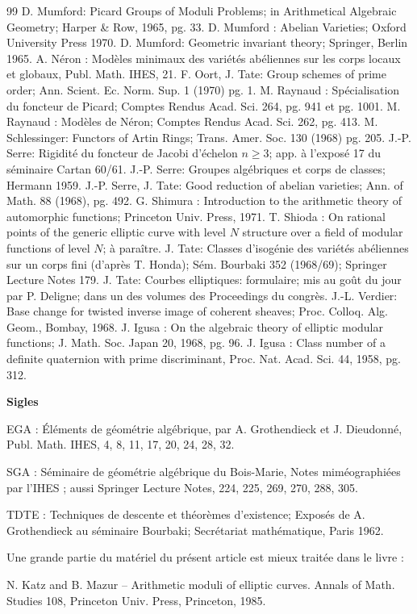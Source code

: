 \documentclass[12pt,a4paper]{amsart}
\theoremstyle{plain}
\theoremstyle{definition}
\theoremstyle{remark}
\begin{document}
\begin{thebibliography}{99}
 D. Mumford: Picard Groups of Moduli Problems; in Arithmetical Algebraic Geometry; Harper \& Row, 1965, pg. 33.
 D. Mumford : Abelian Varieties; Oxford University Press 1970.
 D. Mumford: Geometric invariant theory; Springer, Berlin 1965.
 A. N\'eron : Mod\`eles minimaux des vari\'et\'es ab\'eliennes sur les corps locaux et globaux, Publ. Math. IHES, 21.
 F. Oort, J. Tate: Group schemes of prime order; Ann. Scient. Ec. Norm. Sup. 1 (1970) pg. 1.
 M. Raynaud : Sp\'ecialisation du foncteur de Picard; Comptes Rendus Acad. Sci. 264, pg. 941 et pg. 1001.
 M. Raynaud : Mod\`eles de N\'eron; Comptes Rendus Acad. Sci. 262, pg. 413.
 M. Schlessinger: Functors of Artin Rings; Trans. Amer. Soc. 130 (1968) pg. 205.
 J.-P. Serre: Rigidit\'e du foncteur de Jacobi d'\'echelon $n \geq 3$; app. \`a l'expos\'e 17 du s\'eminaire Cartan 60/61.
 J.-P. Serre: Groupes alg\'ebriques et corps de classes; Hermann 1959.
 J.-P. Serre, J. Tate: Good reduction of abelian varieties; Ann. of Math. 88 (1968), pg. 492.
 G. Shimura : Introduction to the arithmetic theory of automorphic functions; Princeton Univ. Press, 1971.
 T. Shioda : On rational points of the generic elliptic curve with level $N$ structure over a field of modular functions of level $N$; \`a para\^itre.
 J. Tate: Classes d'isog\'enie des vari\'et\'es ab\'eliennes sur un corps fini (d'apr\`es T. Honda); S\'em. Bourbaki 352 (1968/69); Springer Lecture Notes 179.
 J. Tate: Courbes elliptiques: formulaire; mis au go\^ut du jour par P. Deligne; dans un des volumes des Proceedings du congr\`es.
 J.-L. Verdier: Base change for twisted inverse image of coherent sheaves; Proc. Colloq. Alg. Geom., Bombay, 1968.
 J. Igusa : On the algebraic theory of elliptic modular functions; J. Math. Soc. Japan 20, 1968, pg. 96.
 J. Igusa : Class number of a definite quaternion with prime discriminant, Proc. Nat. Acad. Sci. 44, 1958, pg. 312.
\end{thebibliography}

\bigskip
\noindent \textbf{Sigles}

\medskip
\noindent EGA : \'El\'ements de g\'eom\'etrie alg\'ebrique, par A. Grothendieck et J. Dieudonn\'e, Publ. Math. IHES, 4, 8, 11, 17, 20, 24, 28, 32.

\medskip
\noindent SGA : S\'eminaire de g\'eom\'etrie alg\'ebrique du Bois-Marie, Notes mim\'eographi\'ees par l'IHES ; aussi Springer Lecture Notes, 224, 225, 269, 270, 288, 305.

\medskip
\noindent TDTE : Techniques de descente et th\'eor\`emes d'existence; Expos\'es de A. Grothendieck au s\'eminaire Bourbaki; Secr\'etariat math\'ematique, Paris 1962.

\medskip
\noindent Une grande partie du mat\'eriel du pr\'esent article est mieux trait\'ee dans le livre :

N. Katz and B. Mazur -- Arithmetic moduli of elliptic curves. Annals of Math. Studies 108, Princeton Univ. Press, Princeton, 1985.
\end{document}
